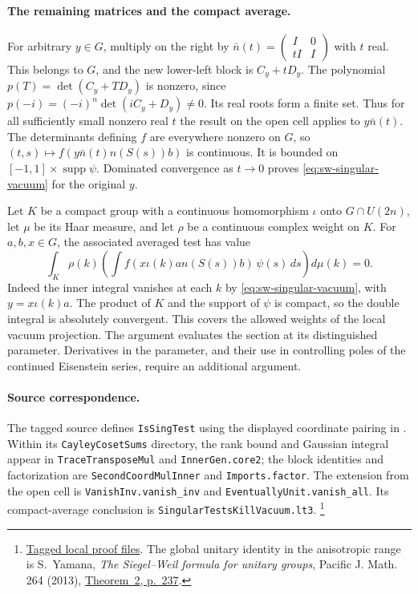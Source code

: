 \paragraph{The remaining matrices and the compact average.}
For arbitrary \(y\in G\), multiply on the right by
\(\bar n(t)=\left(\begin{smallmatrix}I&0\\tI&I\end{smallmatrix}\right)\)
with \(t\) real. This belongs to \(G\), and the new lower-left block
is \(C_y+tD_y\). The polynomial \(p(T)=\det(C_y+TD_y)\) is nonzero,
since \(p(-i)=(-i)^n\det(iC_y+D_y)\ne0\). Its real roots form a
finite set. Thus for all sufficiently small nonzero real \(t\)
the result on the open cell applies to \(y\bar n(t)\).
The determinants defining \(f\) are everywhere nonzero on \(G\),
so \((t,s)\mapsto f(y\bar n(t)n(S(s))b)\) is continuous. It is
bounded on \([-1,1]\times\operatorname{supp}\psi\).
Dominated convergence as \(t\to0\) proves
\eqref{eq:sw-singular-vacuum} for the original \(y\).

Let \(K\) be a compact group with a continuous homomorphism
\(\iota\) onto \(G\cap U(2n)\), let \(\mu\) be its Haar measure,
and let \(\rho\) be a continuous complex weight on \(K\).
For \(a,b,x\in G\), the associated averaged test has value
\[
 \int_K \rho(k)\left(\int
       f(x\iota(k)a n(S(s)) b)\,\psi(s)\,ds\right)d\mu(k)=0.
\]
Indeed the inner integral vanishes at each \(k\) by
\eqref{eq:sw-singular-vacuum}, with \(y=x\iota(k)a\).
The product of \(K\) and the support of \(\psi\) is compact,
so the double integral is absolutely convergent. This covers
the allowed weights of the local vacuum projection.
The argument evaluates the section at its distinguished parameter.
Derivatives in the parameter, and their use in controlling poles
of the continued Eisenstein series, require an additional argument.

\paragraph{Source correspondence.}
The tagged source defines \texttt{IsSingTest} using the displayed
coordinate pairing in
.
Within its \texttt{CayleyCosetSums} directory, the rank bound and
Gaussian integral appear in \texttt{TraceTransposeMul} and
\texttt{InnerGen.core2}; the block identities and factorization
are \texttt{SecondCoordMulInner} and \texttt{Imports.factor}.
The extension from the open cell is
\texttt{VanishInv.vanish\_inv} and
\texttt{EventuallyUnit.vanish\_all}. Its compact-average conclusion
is \texttt{SingularTestsKillVacuum.lt3}.
\footnote{\href{https://github.com/ChristianKudeba/alpoge-rh-verification/tree/alpoge-source-7cbf7a0c/src/Development/WeilBound/RepresentationTheoryGL/SiegelWeilProof/HolomorphicContinuation/CayleyCosetSums}{Tagged local proof files}.
The global unitary identity in the anisotropic range is
S.~Yamana, \emph{The Siegel--Weil formula for unitary groups},
Pacific J. Math. 264 (2013),
\href{https://msp.org/pjm/2013/264-1/pjm-v264-n1-p11-p.pdf}{Theorem~2, p.~237}.}
